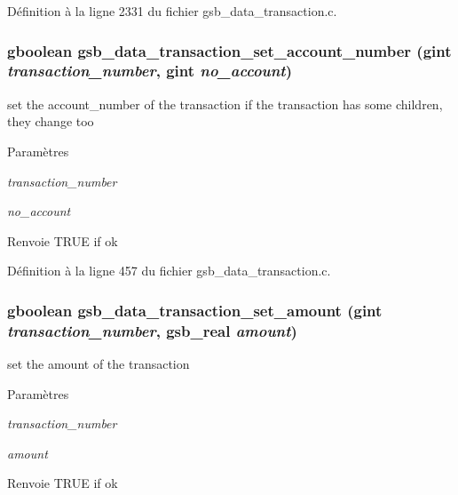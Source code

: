 Définition à la ligne 2331 du fichier gsb\_\-data\_\-transaction.c.

\subsubsection[{gsb\_\-data\_\-transaction\_\-set\_\-account\_\-number}]{\setlength{\rightskip}{0pt plus 5cm}gboolean gsb\_\-data\_\-transaction\_\-set\_\-account\_\-number (gint {\em transaction\_\-number}, \/  gint {\em no\_\-account})}\label{gsb__data__transaction_8h_a06c1da0256f9341801ea21685bb99186}
set the account\_\-number of the transaction if the transaction has some children, they change too


\begin{DoxyParams}{Paramètres}
\item[{\em transaction\_\-number}]\item[{\em no\_\-account}]\end{DoxyParams}
\begin{DoxyReturn}{Renvoie}
TRUE if ok 
\end{DoxyReturn}


Définition à la ligne 457 du fichier gsb\_\-data\_\-transaction.c.

\subsubsection[{gsb\_\-data\_\-transaction\_\-set\_\-amount}]{\setlength{\rightskip}{0pt plus 5cm}gboolean gsb\_\-data\_\-transaction\_\-set\_\-amount (gint {\em transaction\_\-number}, \/  {\bf gsb\_\-real} {\em amount})}\label{gsb__data__transaction_8h_a76fbbfabc4f16f0f8a51d843785862d7}
set the amount of the transaction


\begin{DoxyParams}{Paramètres}
\item[{\em transaction\_\-number}]\item[{\em amount}]\end{DoxyParams}
\begin{DoxyReturn}{Renvoie}
TRUE if ok 
\end{DoxyReturn}


